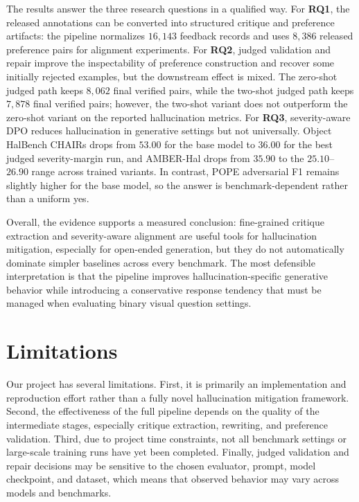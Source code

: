 \documentclass{article}
\begin{document}
The results answer the three research questions in a qualified way. For \textbf{RQ1}, the released annotations can be converted into structured critique and preference artifacts: the pipeline normalizes $16{,}143$ feedback records and uses $8{,}386$ released preference pairs for alignment experiments. For \textbf{RQ2}, judged validation and repair improve the inspectability of preference construction and recover some initially rejected examples, but the downstream effect is mixed. The zero-shot judged path keeps $8{,}062$ final verified pairs, while the two-shot judged path keeps $7{,}878$ final verified pairs; however, the two-shot variant does not outperform the zero-shot variant on the reported hallucination metrics. For \textbf{RQ3}, severity-aware DPO reduces hallucination in generative settings but not universally. Object HalBench CHAIRs drops from $53.00$ for the base model to $36.00$ for the best judged severity-margin run, and AMBER-Hal drops from $35.90$ to the $25.10$--$26.90$ range across trained variants. In contrast, POPE adversarial F1 remains slightly higher for the base model, so the answer is benchmark-dependent rather than a uniform yes.

Overall, the evidence supports a measured conclusion: fine-grained critique extraction and severity-aware alignment are useful tools for hallucination mitigation, especially for open-ended generation, but they do not automatically dominate simpler baselines across every benchmark. The most defensible interpretation is that the pipeline improves hallucination-specific generative behavior while introducing a conservative response tendency that must be managed when evaluating binary visual question settings.


\section{Limitations}

Our project has several limitations. First, it is primarily an implementation and reproduction effort rather than a fully novel hallucination mitigation framework. Second, the effectiveness of the full pipeline depends on the quality of the intermediate stages, especially critique extraction, rewriting, and preference validation. Third, due to project time constraints, not all benchmark settings or large-scale training runs have yet been completed. Finally, judged validation and repair decisions may be sensitive to the chosen evaluator, prompt, model checkpoint, and dataset, which means that observed behavior may vary across models and benchmarks.
\end{document}

